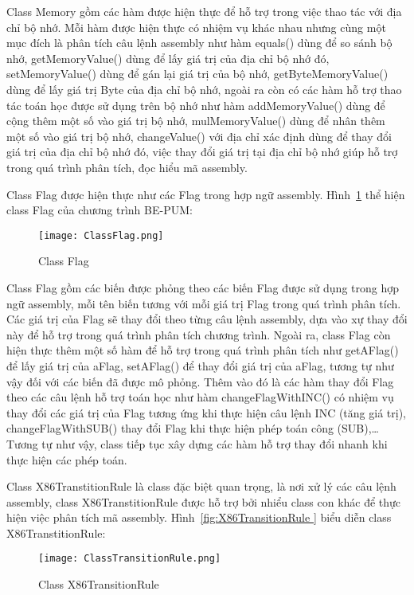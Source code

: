 	Class Memory gồm các hàm được hiện thực để hỗ trợ trong việc thao tác với địa chỉ bộ nhớ. Mỗi hàm được hiện thực có nhiệm vụ khác nhau nhưng cùng một mục đích là phân tích câu lệnh assembly như hàm equals() dùng để so sánh bộ nhớ, getMemoryValue() dùng để lấy giá trị của địa chỉ bộ nhớ đó, setMemoryValue() dùng để gán lại giá trị của bộ nhớ, getByteMemoryValue() dùng để lấy giá trị Byte của địa chỉ bộ nhớ, ngoài ra còn có các hàm hỗ trợ thao tác toán học được sử dụng trên bộ nhớ như hàm addMemoryValue() dùng để cộng thêm một số vào giá trị bộ nhớ, mulMemoryValue() dùng để nhân thêm một số vào giá trị bộ nhớ, changeValue() với địa chỉ xác định dùng để thay đổi giá trị của địa chỉ bộ nhớ đó, việc thay đổi giá trị tại địa chỉ bộ nhớ giúp hỗ trợ trong quá trình phân tích, đọc hiểu mã assembly.
	
	\newpage
	Class Flag được hiện thực như các Flag trong hợp ngữ assembly. Hình~\ref{fig:ClassFlag} thể hiện class Flag của chương trình BE-PUM:	
		\begin{center}
			\begin{figure}[htp]
				\begin{center}
					\texttt{[image: ClassFlag.png]}
				\end{center}
				\caption{Class Flag}	
					\label{fig:ClassFlag}		
			\end{figure}
		\end{center}			
	
Class Flag gồm các biến được phỏng theo các biến Flag được sử dụng trong hợp ngữ assembly, mỗi tên biến tương với mỗi giá trị Flag trong quá trình phân tích. Các giá trị của Flag sẽ thay đổi theo từng câu lệnh assembly, dựa vào xự thay đổi này để hỗ trợ trong quá trình phân tích chương trình. Ngoài ra, class Flag còn hiện thực thêm một số hàm để hỗ trợ trong quá trình phân tích như getAFlag() để lấy giá trị của aFlag, setAFlag() để thay đổi giá trị của aFlag, tương tự như vậy đối với các biến đã được mô phỏng. Thêm vào đó là các hàm thay đổi Flag theo các câu lệnh hỗ trợ toán học như hàm changeFlagWithINC() có nhiệm vụ thay đổi các giá trị của Flag tương ứng khi thực hiện câu lệnh INC (tăng giá trị), changeFlagWithSUB() thay đổi Flag khi thực hiện phép toán công (SUB),… Tương tự như vậy, class tiếp tục xây dựng các hàm hỗ trợ thay đổi nhanh khi thực hiện các phép toán.


	\newpage
	Class X86TranstitionRule là class đặc biệt quan trọng, là nơi xử lý các câu lệnh assembly, class X86TranstitionRule được hỗ trợ bởi nhiểu class con khác để thực hiện việc phân tích mã assembly. Hình~\ref{fig:X86TransitionRule	} biểu diễn class X86TranstitionRule:
	\begin{center}
			\begin{figure}[htp]
				\begin{center}
					\texttt{[image: ClassTransitionRule.png]}
				\end{center}
				\caption{Class X86TransitionRule	}	
					\label{fig:X86TransitionRule	}		
			\end{figure}
		\end{center}			
		
